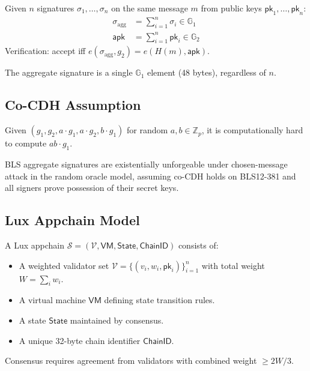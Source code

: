 \begin{definition}
Given $n$ signatures $\sigma_1, \ldots, \sigma_n$ on the same message $m$ from public keys $\mathsf{pk}_1, \ldots, \mathsf{pk}_n$:
\begin{align}
    \sigma_{\text{agg}} &= \sum_{i=1}^{n} \sigma_i \in \mathbb{G}_1 \\
    \mathsf{apk} &= \sum_{i=1}^{n} \mathsf{pk}_i \in \mathbb{G}_2
\end{align}
Verification: accept iff $e(\sigma_{\text{agg}}, g_2) = e(H(m), \mathsf{apk})$.
\end{definition}

The aggregate signature is a single $\mathbb{G}_1$ element (48 bytes), regardless of $n$.

\subsection{Co-CDH Assumption}

\begin{definition}
Given $(g_1, g_2, a \cdot g_1, a \cdot g_2, b \cdot g_1)$ for random $a, b \in \mathbb{Z}_p$, it is computationally hard to compute $ab \cdot g_1$.
\end{definition}

\begin{theorem}
BLS aggregate signatures are existentially unforgeable under chosen-message attack in the random oracle model, assuming co-CDH holds on BLS12-381 and all signers prove possession of their secret keys.
\end{theorem}

\subsection{Lux Appchain Model}

\begin{definition}[Appchain]
A Lux appchain $\mathcal{S} = (\mathcal{V}, \mathsf{VM}, \mathsf{State}, \mathsf{ChainID})$ consists of:
\begin{itemize}
    \item A weighted validator set $\mathcal{V} = \{(v_i, w_i, \mathsf{pk}_i)\}_{i=1}^{n}$ with total weight $W = \sum_i w_i$.
    \item A virtual machine $\mathsf{VM}$ defining state transition rules.
    \item A state $\mathsf{State}$ maintained by consensus.
    \item A unique 32-byte chain identifier $\mathsf{ChainID}$.
\end{itemize}
Consensus requires agreement from validators with combined weight $\geq 2W/3$.
\end{definition}


